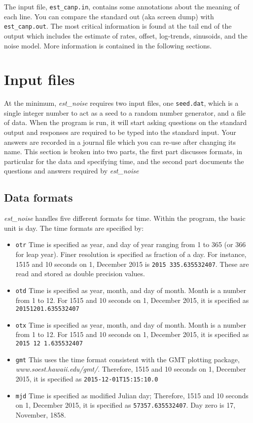 \documentclass[12pt]{amsart}
\begin{document}
The input file, \texttt{est\_canp.in}, contains some annotations about the meaning of each line.  You can compare
the standard out (aka screen dump) with \texttt{est\_canp.out}.  The most critical information is found at the tail
end of the output which includes the estimate of rates, offset, log-trends, sinusoids, and the noise model.  More information
is contained in the following sections.

\section{Input files}

At the minimum, \textit{est\_noise} requires two input files, one \texttt{seed.dat}, which is a single integer number
to act as a seed to a random number generator, and a file of data.  When the program is run, it will start
asking questions on the standard output and responses are required to be typed into the
standard input. Your answers are recorded in a journal file which you
can re-use after changing its name. This section is broken into two parts, the first part discusses formats, in particular
for the data and specifying time, and the second part documents the questions and answers required by
\textit{est\_noise}

\subsection{Data formats}

\textit{est\_noise} handles five different formats for time.  Within the program, the basic unit is day.  The time formats
are specified by:
\begin{itemize}
\item \texttt{otr} Time is specified as year, and day of year ranging from 1 to 365 (or 366 for leap year). Finer resolution
is specified as fraction of a day.  For instance, 1515 and 10 seconds on 1, December 2015 is \texttt{2015 335.635532407}. These are read and stored as double precision values.
\item \texttt{otd} Time is specified as year, month, and day of month.  Month is a number from 1 to 12. For 
1515 and 10 seconds on 1, December 2015, it is specified as \texttt{20151201.635532407}
\item \texttt{otx} Time is specified as year, month, and day of month.  Month is a number from 1 to 12. For 
1515 and 10 seconds on 1, December 2015, it is specified as \texttt{2015 12 1.635532407}
\item \texttt{gmt} This uses the time format consistent with the GMT plotting package, \textit{www.soest.hawaii.edu/gmt/}.
Therefore, 1515 and 10 seconds on 1, December 2015, it is specified as \texttt{2015-12-01T15:15:10.0}
\item \texttt{mjd} Time is specified as modified Julian day; Therefore, 1515 and 10 seconds on 1, December 2015, it is specified as \texttt{57357.635532407}. Day zero is 17, November, 1858.
\end{itemize}
\end{document}
